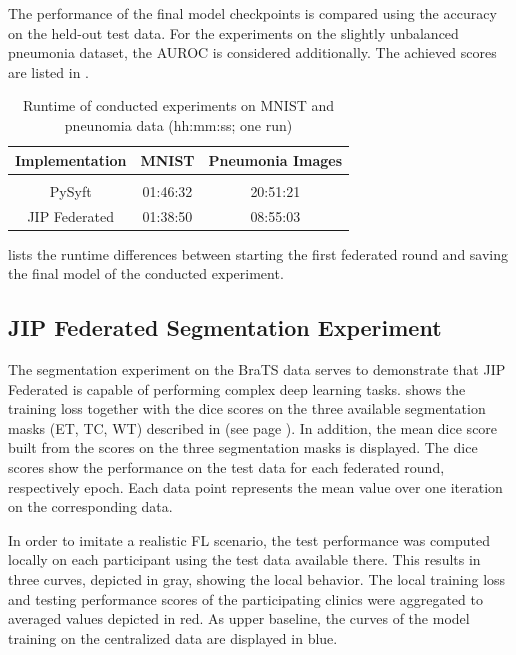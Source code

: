 The performance of the final model checkpoints is compared using the accuracy on the held-out test data. 
For the experiments on the slightly unbalanced pneumonia dataset, the AUROC is considered additionally. The achieved scores are listed in .

\begin{table}[htbp]
  \centering
  \begin{tabular}{ccc}
  Implementation & MNIST & Pneumonia Images \\
  \hline \\[-2.5ex] %
  PySyft        & 01:46:32 & 20:51:21 \\
  JIP Federated & 01:38:50 & 08:55:03 \\
 \end{tabular}
 \caption[Runtime of conducted experiments on MNIST and pneunomia data]{Runtime of conducted experiments on MNIST and pneunomia data (hh:mm:ss; one run)}
 \label{tab:RuntimeExp}
\end{table}

 lists the runtime differences between starting the first federated round and saving the final model of the conducted experiment.




\subsection{JIP Federated Segmentation Experiment}
\label{subsec:ResultsSegmentation}

The segmentation experiment on the BraTS data serves to demonstrate that JIP Federated is capable of performing complex deep learning tasks.
 shows the training loss together with the dice scores on the three available segmentation masks (ET, TC, WT) described in  (see page \pageref{subsec:MethodsExperiments}). In addition, the mean dice score built from the scores on the three segmentation masks is displayed.
The dice scores show the performance on the test data for each federated round, respectively epoch. Each data point represents the mean value over one iteration on the corresponding data.

In order to imitate a realistic FL scenario, the test performance was computed locally on each participant using the test data available there. This results in three curves, depicted in gray, showing the local behavior. The local training loss and testing performance scores of the participating clinics were aggregated to averaged values depicted in red.
As upper baseline, the curves of the model training on the centralized data are displayed in blue.

